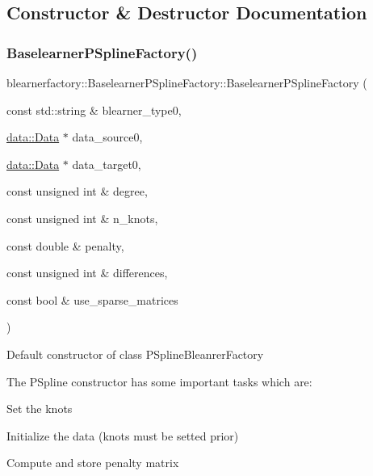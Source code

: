\subsection{Constructor \& Destructor Documentation}
\mbox{\label{classblearnerfactory_1_1_baselearner_p_spline_factory_a295bad8fb9554cb45a56c8b6c5e8e047}} 
\subsubsection{\texorpdfstring{Baselearner\+P\+Spline\+Factory()}{BaselearnerPSplineFactory()}}
{\footnotesize\ttfamily blearnerfactory\+::\+Baselearner\+P\+Spline\+Factory\+::\+Baselearner\+P\+Spline\+Factory (\begin{DoxyParamCaption}\item[{const std\+::string \&}]{blearner\+\_\+type0,  }\item[{\hyperlink{classdata_1_1_data}{data\+::\+Data} $\ast$}]{data\+\_\+source0,  }\item[{\hyperlink{classdata_1_1_data}{data\+::\+Data} $\ast$}]{data\+\_\+target0,  }\item[{const unsigned int \&}]{degree,  }\item[{const unsigned int \&}]{n\+\_\+knots,  }\item[{const double \&}]{penalty,  }\item[{const unsigned int \&}]{differences,  }\item[{const bool \&}]{use\+\_\+sparse\+\_\+matrices }\end{DoxyParamCaption})}



Default constructor of class {\ttfamily P\+Spline\+Bleanrer\+Factory} 

The P\+Spline constructor has some important tasks which are\+:
\begin{DoxyItemize}
\item Set the knots
\item Initialize the data (knots must be setted prior)
\item Compute and store penalty matrix
\end{DoxyItemize}


